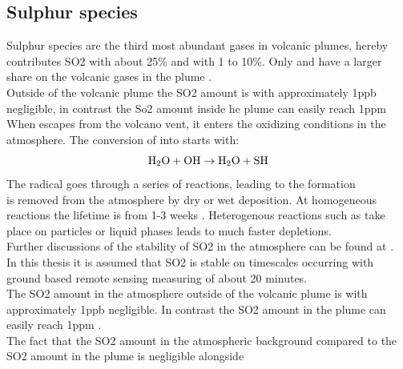 \documentclass  [
  paper    = a4,
  BCOR     = 10mm,
  twoside,
  fontsize = 12pt,
  fleqn,
  toc      = bibnumbered,
  toc      = listofnumbered,
  numbers  = noendperiod,
  headings = normal,
  listof   = leveldown,
  version  = 3.03
]                                       {scrreprt}
\begin{document}
\subsection{Sulphur species}
Sulphur species are the third most abundant gases in volcanic plumes, hereby contributes SO2 with about 25\% and  with 1 to 10\%. Only  and  have a larger share on the volcanic gases in the plume .\\
Outside of the volcanic plume the SO2 amount is with approximately 1ppb negligible, in contrast the So2 amount inside he plume can easily reach 1ppm \cite{Coppenheimer 2003}
When  escapes from the volcano vent, it enters the oxidizing conditions in the atmosphere. The conversion of  into  starts with:
\begin{equation*}
\ce{H2O}+\ce{OH}\rightarrow \ce{H2O}+\ce{SH}
\end{equation*}
The  radical goes through a series of reactions, leading to the  formation \cite{Seinfeld}\\
 is removed from the atmosphere by dry or wet
deposition. At homogeneous reactions the lifetime is from 1-3 weeks \cite{robock2000volcanic}. Heterogenous reactions such as take place on particles or liquid phases leads to much faster depletions.\\
Further discussions of the stability of SO2 in the atmosphere can be found at \cite{lubcke2014optical}.\\
In this thesis it is assumed that SO2 is stable on timescales occurring with ground based remote sensing measuring of about 20 minutes. \\
The SO2 amount in the atmosphere outside of the volcanic plume is with approximately 1ppb negligible. In contrast the SO2 amount in the plume can easily reach 1ppm \cite{Oppenheimer}.\\
The fact that the SO2 amount in the atmospheric background compared to the SO2 amount in the plume is negligible alongside
\end{document}
